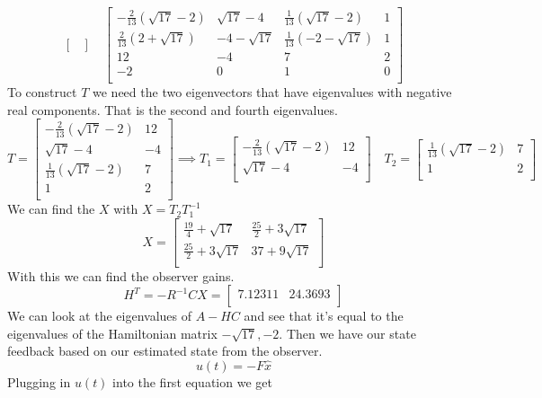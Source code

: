 \documentclass{article}
\begin{document}
\begin{enumerate}[(a)]
$$\begin{bmatrix}
\end{bmatrix}
\quad
\begin{bmatrix}
-\frac{2}{13} \left(\sqrt{17}-2\right) & \sqrt{17}-4 & \frac{1}{13} \left(\sqrt{17}-2\right) & 1 \\
\frac{2}{13} \left(2+\sqrt{17}\right) & -4-\sqrt{17} & \frac{1}{13}
\left(-2-\sqrt{17}\right) & 1 \\
12 & -4 & 7 & 2 \\
-2 & 0 & 1 & 0 \\
\end{bmatrix}
$$
To construct $T$ we need the two eigenvectors that have eigenvalues with negative real components.
That is the second and fourth eigenvalues.
$$
T =
\begin{bmatrix}
-\frac{2}{13} \left(\sqrt{17}-2\right) & 12 \\
\sqrt{17}-4 & -4 \\
\frac{1}{13} \left(\sqrt{17}-2\right) & 7 \\
1 & 2 \\
\end{bmatrix}
\implies T_1 =
\begin{bmatrix}
-\frac{2}{13} \left(\sqrt{17}-2\right) & 12 \\
\sqrt{17}-4 & -4 \\
\end{bmatrix}
\quad T_2 =
\begin{bmatrix}
\frac{1}{13} \left(\sqrt{17}-2\right) & 7 \\
1 & 2 \\
\end{bmatrix}
$$
We can find the $X$ with $ X = T_2T_1^{-1} $
$$
X =
\begin{bmatrix}
\frac{19}{4}+\sqrt{17} & \frac{25}{2}+3 \sqrt{17} \\
\frac{25}{2}+3 \sqrt{17} & 37+9 \sqrt{17} \\
\end{bmatrix}
$$
With this we can find the observer gains.
$$ H^T = -R^{-1}CX =
\begin{bmatrix}
7.12311 & 24.3693 \\
\end{bmatrix}
$$
We can look at the eigenvalues of $A-HC$ and see that it's equal to the eigenvalues of the Hamiltonian matrix $-\sqrt{17}, -2$.
\newline
\newline
Then we have our state feedback based on our estimated state from the observer.
$$ u(t) = -F\hat{x} $$
Plugging in $u(t)$ into the first equation we get

\end{enumerate}
\end{document}
